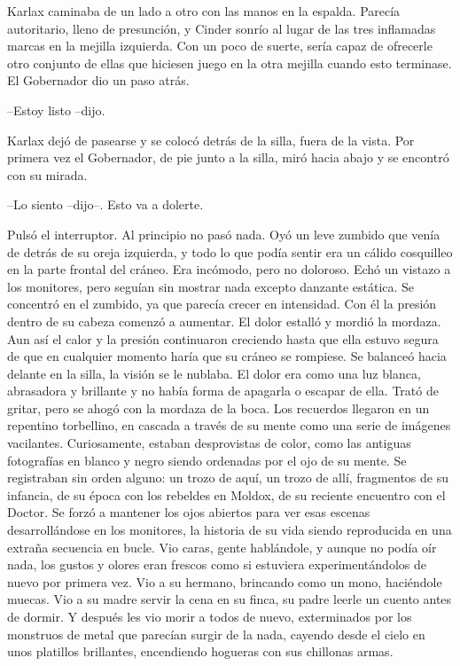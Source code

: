 Karlax caminaba de un lado a otro con las manos en la espalda. Parecía autoritario, lleno de presunción, y Cinder sonrío al lugar de las tres inflamadas marcas en la mejilla izquierda. Con un poco de suerte, sería capaz de ofrecerle otro conjunto de ellas que hiciesen juego en la otra mejilla cuando esto terminase. El Gobernador dio un paso atrás. 

--Estoy listo --dijo. 

Karlax dejó de pasearse y se colocó detrás de la silla, fuera de la vista. Por primera vez el Gobernador, de pie junto a la silla, miró hacia abajo y se encontró con su mirada. 

--Lo siento --dijo--. Esto va a dolerte. 

Pulsó el interruptor. Al principio no pasó nada. Oyó un leve zumbido que venía de detrás de su oreja izquierda, y todo lo que podía sentir era un cálido cosquilleo en la parte frontal del cráneo. Era incómodo, pero no doloroso. Echó un vistazo a los monitores, pero seguían sin mostrar nada excepto danzante estática.
Se concentró en el zumbido, ya que parecía crecer en intensidad. Con él la presión dentro de su cabeza comenzó a aumentar. El dolor estalló y mordió la mordaza. Aun así el calor y la presión continuaron creciendo hasta que ella estuvo segura de que en cualquier momento haría que su cráneo se rompiese. 
Se balanceó hacia delante en la silla, la visión se le nublaba. El dolor era como una luz blanca, abrasadora y brillante y no había forma de apagarla o escapar de ella. Trató de gritar, pero se ahogó con la mordaza de la boca. 
Los recuerdos llegaron en un repentino torbellino, en cascada a través de su mente como una serie de imágenes vacilantes. Curiosamente, estaban desprovistas de color, como las antiguas fotografías en blanco y negro siendo ordenadas por el ojo de su mente. Se registraban sin orden alguno: un trozo de aquí, un trozo de allí, fragmentos de su infancia, de su época con los rebeldes en Moldox, de su reciente encuentro con el Doctor. 
Se forzó a mantener los ojos abiertos para ver esas escenas desarrollándose en los monitores, la historia de su vida siendo reproducida en una extraña secuencia en bucle. 
Vio caras, gente hablándole, y aunque no podía oír nada, los gustos y olores eran frescos como si estuviera experimentándolos de nuevo por primera vez. 
Vio a su hermano, brincando como un mono, haciéndole muecas. Vio a su madre servir la cena en su finca, su padre leerle un cuento antes de dormir. Y después les vio morir a todos de nuevo, exterminados por los monstruos de metal que parecían surgir de la nada, cayendo desde el cielo en unos platillos brillantes, encendiendo hogueras con sus chillonas armas. 
